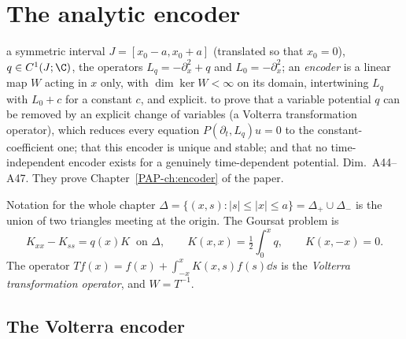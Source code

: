 \chapter[The analytic encoder]{The analytic encoder}\label{ch:cIII4}
\chapterbrief
{a symmetric interval $J=[x_0-a,x_0+a]$ (translated so that $x_0=0$), $q\in C^1(J;\C)$, the operators $L_q=-\partial_x^2+q$ and $L_0=-\partial_x^2$; an \emph{encoder} is a linear map $W$ acting in $x$ only, with $\dim\ker W<\infty$ on its domain, intertwining $L_q$ with $L_0+c$ for a constant $c$, and explicit.}
{to prove that a variable potential $q$ can be removed by an explicit change of variables (a Volterra transformation operator), which reduces every equation $P(\partial_t,L_q)u=0$ to the constant-coefficient one; that this encoder is unique and stable; and that no time-independent encoder exists for a genuinely time-dependent potential.}
{Dim.~A44--A47. They prove Chapter~\ref{PAP-ch:encoder} of the paper.}

\begin{notebox}{Notation for the whole chapter}
$\Delta=\{(x,s):|s|\le|x|\le a\}=\Delta_+\cup\Delta_-$ is the union of two triangles meeting at the origin. The Goursat problem is
\[
K_{xx}-K_{ss}=q(x)K\ \text{ on }\Delta,\qquad K(x,x)=\tfrac12\int_0^xq,\qquad K(x,-x)=0 .\tag{G}
\]
The operator $Tf(x)=f(x)+\int_{-x}^{x}K(x,s)f(s)\dd s$ is the \emph{Volterra transformation operator}, and $W=T^{-1}$.
\end{notebox}

\section{The Volterra encoder}

